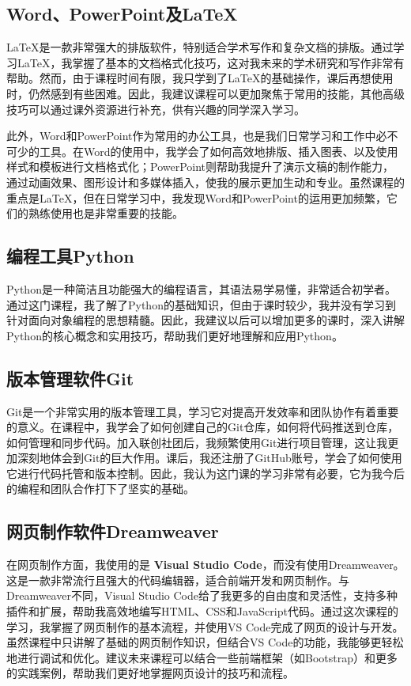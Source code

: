 \documentclass[supercite]{Experimental_Report}
\theoremstyle{definition}
\begin{document}
\subsection{Word、PowerPoint及LaTeX}

LaTeX是一款非常强大的排版软件，特别适合学术写作和复杂文档的排版。通过学习LaTeX，我掌握了基本的文档格式化技巧，这对我未来的学术研究和写作非常有帮助。然而，由于课程时间有限，我只学到了LaTeX的基础操作，课后再想使用时，仍然感到有些困难。因此，我建议课程可以更加聚焦于常用的技能，其他高级技巧可以通过课外资源进行补充，供有兴趣的同学深入学习。

此外，Word和PowerPoint作为常用的办公工具，也是我们日常学习和工作中必不可少的工具。在Word的使用中，我学会了如何高效地排版、插入图表、以及使用样式和模板进行文档格式化；PowerPoint则帮助我提升了演示文稿的制作能力，通过动画效果、图形设计和多媒体插入，使我的展示更加生动和专业。虽然课程的重点是LaTeX，但在日常学习中，我发现Word和PowerPoint的运用更加频繁，它们的熟练使用也是非常重要的技能。

\subsection{编程工具Python}

Python是一种简洁且功能强大的编程语言，其语法易学易懂，非常适合初学者。通过这门课程，我了解了Python的基础知识，但由于课时较少，我并没有学习到针对面向对象编程的思想精髓。因此，我建议以后可以增加更多的课时，深入讲解Python的核心概念和实用技巧，帮助我们更好地理解和应用Python。

\subsection{版本管理软件Git}

Git是一个非常实用的版本管理工具，学习它对提高开发效率和团队协作有着重要的意义。在课程中，我学会了如何创建自己的Git仓库，如何将代码推送到仓库，如何管理和同步代码。加入联创社团后，我频繁使用Git进行项目管理，这让我更加深刻地体会到Git的巨大作用。课后，我还注册了GitHub账号，学会了如何使用它进行代码托管和版本控制。因此，我认为这门课的学习非常有必要，它为我今后的编程和团队合作打下了坚实的基础。

\subsection{网页制作软件Dreamweaver}

在网页制作方面，我使用的是 \textbf{Visual Studio Code}，而没有使用Dreamweaver。这是一款非常流行且强大的代码编辑器，适合前端开发和网页制作。与Dreamweaver不同，Visual Studio Code给了我更多的自由度和灵活性，支持多种插件和扩展，帮助我高效地编写HTML、CSS和JavaScript代码。通过这次课程的学习，我掌握了网页制作的基本流程，并使用VS Code完成了网页的设计与开发。虽然课程中只讲解了基础的网页制作知识，但结合VS Code的功能，我能够更轻松地进行调试和优化。建议未来课程可以结合一些前端框架（如Bootstrap）和更多的实践案例，帮助我们更好地掌握网页设计的技巧和流程。 

\nocite{*} %

%
%
\end{document}
